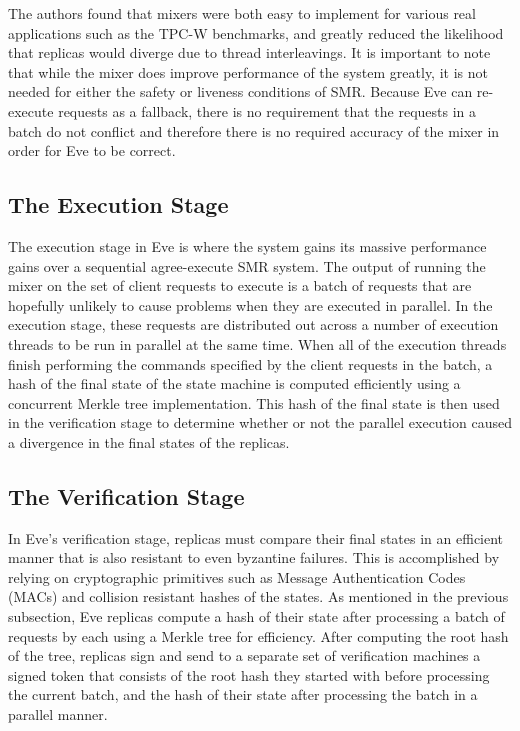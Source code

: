 \documentclass[11pt, oneside]{report}
\begin{document}
The authors found that mixers were both easy to implement for various real applications such as the TPC-W benchmarks, and greatly reduced the likelihood that replicas would diverge due to thread interleavings. 
It is important to note that while the mixer does improve performance of the system greatly, it is not needed for either the safety or liveness conditions of SMR. 
Because Eve can re-execute requests as a fallback, there is no requirement that the requests in a batch do not conflict and therefore there is no required accuracy of the mixer in order for Eve to be correct.

\subsection{The Execution Stage}\label{EveExecution}

The execution stage in Eve is where the system gains its massive performance gains over a sequential agree-execute SMR system. 
The output of running the mixer on the set of client requests to execute is a batch of requests that are hopefully unlikely to cause problems when they are executed in parallel. 
In the execution stage, these requests are distributed out across a number of execution threads to be run in parallel at the same time. 
When all of the execution threads finish performing the commands specified by the client requests in the batch, a hash of the final state of the state machine is computed efficiently using a concurrent Merkle tree implementation. 
This hash of the final state is then used in the verification stage to determine whether or not the parallel execution caused a divergence in the final states of the replicas.

\subsection{The Verification Stage}\label{EveVerification}
In Eve's verification stage, replicas must compare their final states in an efficient manner that is also resistant to even byzantine failures. 
This is accomplished by relying on cryptographic primitives such as Message Authentication Codes (MACs) and collision resistant hashes of the states. 
As mentioned in the previous subsection, Eve replicas compute a hash of their state after processing a batch of requests by each using a Merkle tree for efficiency. 
After computing the root hash of the tree, replicas sign and send to a separate set of verification machines a signed token that consists of the root hash they started with before processing the current batch, and the hash of their state after processing the batch in a parallel manner.
\end{document}
